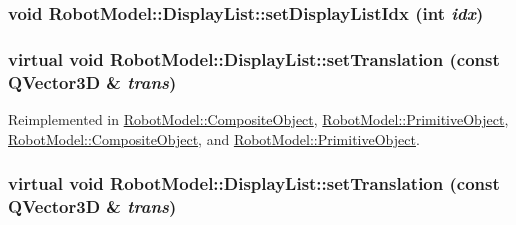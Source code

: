 \hypertarget{class_robot_model_1_1_display_list_a78c642f12487ea830475a0e860aeee38}{
\subsubsection[{setDisplayListIdx}]{\setlength{\rightskip}{0pt plus 5cm}void RobotModel::DisplayList::setDisplayListIdx (int {\em idx})}}
\label{class_robot_model_1_1_display_list_a78c642f12487ea830475a0e860aeee38}
\hypertarget{class_robot_model_1_1_display_list_a6c9c1298e237ab25037ad9d7163b118c}{
\subsubsection[{setTranslation}]{\setlength{\rightskip}{0pt plus 5cm}virtual void RobotModel::DisplayList::setTranslation (const QVector3D \& {\em trans})}}
\label{class_robot_model_1_1_display_list_a6c9c1298e237ab25037ad9d7163b118c}


Reimplemented in \hyperlink{class_robot_model_1_1_composite_object_ae925e59246174c9d3b74d459b32835e3}{RobotModel::CompositeObject}, \hyperlink{class_robot_model_1_1_primitive_object_ae6c417003b52df18a52711031e95c44a}{RobotModel::PrimitiveObject}, \hyperlink{class_robot_model_1_1_composite_object_a6a24e273234d2919c48d36182c409ffd}{RobotModel::CompositeObject}, and \hyperlink{class_robot_model_1_1_primitive_object_a58f3d8655dd442ee1032f3582027604a}{RobotModel::PrimitiveObject}.\hypertarget{class_robot_model_1_1_display_list_a6c9c1298e237ab25037ad9d7163b118c}{
\subsubsection[{setTranslation}]{\setlength{\rightskip}{0pt plus 5cm}virtual void RobotModel::DisplayList::setTranslation (const QVector3D \& {\em trans})}}
\label{class_robot_model_1_1_display_list_a6c9c1298e237ab25037ad9d7163b118c}


